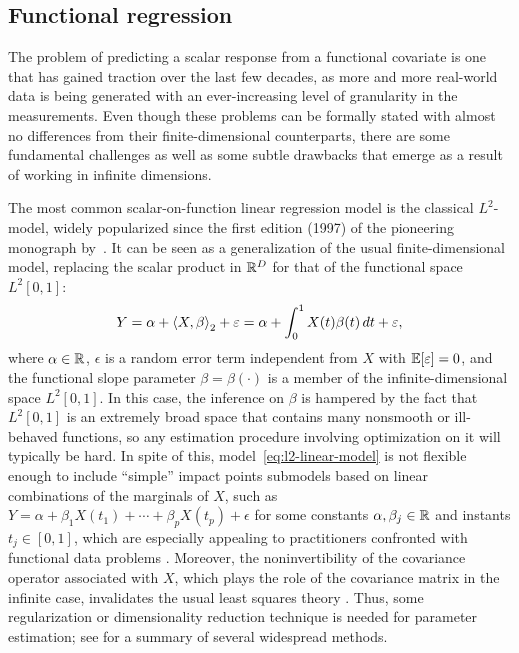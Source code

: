 \subsection{Functional regression}\label{sec:functional-regression}

The problem of predicting a scalar response from a functional covariate is one that has gained traction over the last few decades, as more and more real-world data is being generated with an ever-increasing level of granularity in the measurements. Even though these problems can be formally stated with almost no differences from their finite-dimensional counterparts, there are some fundamental challenges as well as some subtle drawbacks that emerge as a result of working in infinite dimensions.

The most common scalar-on-function linear regression model is the classical \(L^2\)-model, widely popularized since the first edition (1997) of the pioneering monograph by~\citet{ramsay2005functional}. It can be seen as a generalization of the usual finite-dimensional model, replacing the scalar product in \(\mathbb{R}^D\) for that of the functional space \(L^2[0,1]\):
\begin{equation}\label{eq:l2-linear-model}
  Y = \alpha + \left\langle X,\beta\right\rangle_2 + \varepsilon = \alpha + \int_0^1 X(t)\beta(t)\, dt + \varepsilon,
\end{equation}
where \(\alpha\in \mathbb{R}\), \(\epsilon\) is a random error term independent from \(X\) with \(\mathbb{E} [\varepsilon]=0\), and the functional slope parameter \(\beta=\beta(\cdot)\) is a member of the infinite-dimensional space \(L^2[0, 1]\). In this case, the inference on \(\beta\) is hampered by the fact that \(L^2[0,1]\) is an extremely broad space that contains many nonsmooth or ill-behaved functions, so any estimation procedure involving optimization on it will typically be hard. In spite of this, model~\eqref{eq:l2-linear-model} is not flexible enough to include ``simple'' impact points submodels based on linear combinations of the marginals of \(X\), such as \(Y=\alpha + \beta_1 X(t_1)+ \cdots + \beta_p X(t_p) + \epsilon\) for some constants \(\alpha,\beta_j\in\mathbb{R}\) and instants \(t_j\in[0,1]\), which are especially appealing to practitioners confronted with functional data problems \citep[see][for additional details]{berrendero2024functional}. Moreover, the noninvertibility of the covariance operator associated with \(X\), which plays the role of the covariance matrix in the infinite case, invalidates the usual least squares theory \citep{cardot2010functional}. Thus, some regularization or dimensionality reduction technique is needed for parameter estimation; see \citet{reiss2017methods} for a summary of several widespread methods.

